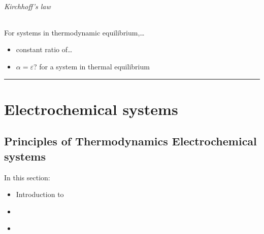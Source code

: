 \documentclass[letterpaper,10pt,english]{jupyterBook}
\begin{document}
\paragraph{Kirchhoff’s law}
\label{\detokenize{ch/heat-transfer-radiation:kirchhoff-s-law}}
\sphinxAtStartPar
For systems in thermodynamic equilibrium,…
\begin{itemize}
\item {} 
\sphinxAtStartPar
constant ratio of…

\item {} 
\sphinxAtStartPar
\(\alpha = \varepsilon\)? for a system in thermal equilibrium 

\end{itemize}


\bigskip\hrule\bigskip


\sphinxstepscope


\part{Electro\sphinxhyphen{}chemical systems}

\sphinxstepscope


\chapter{Principles of Thermodynamics \sphinxhyphen{} Electro\sphinxhyphen{}chemical systems}
\label{\detokenize{ch/principles-electrochemical:principles-of-thermodynamics-electro-chemical-systems}}\label{\detokenize{ch/principles-electrochemical:physics-thermodynamics-foundation-principles-electro-chemical}}\label{\detokenize{ch/principles-electrochemical::doc}}
\sphinxAtStartPar
In this section:
\begin{itemize}
\item {} 
\sphinxAtStartPar
Introduction to {\hyperref[\detokenize{ch/principles-electrochemical:physics-thermodynamics-foundation-principles-electro-chemical-reactions}]{}}

\item {} 
\sphinxAtStartPar
{\hyperref[\detokenize{ch/principles-electrochemical:physics-thermodynamics-foundation-principles-electro-chemical-first-principle}]{}}

\item {} 
\sphinxAtStartPar
{\hyperref[\detokenize{ch/principles-electrochemical:physics-thermodynamics-foundation-principles-electro-chemical-law-of-mass-action}]{}}

\end{itemize}
\end{document}
